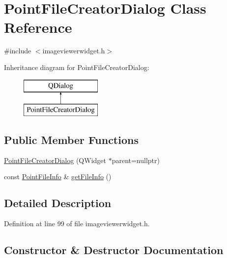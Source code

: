 \hypertarget{class_point_file_creator_dialog}{}\section{Point\+File\+Creator\+Dialog Class Reference}
\label{class_point_file_creator_dialog}


{\ttfamily \#include $<$imageviewerwidget.\+h$>$}

Inheritance diagram for Point\+File\+Creator\+Dialog\+:\begin{figure}[H]
\begin{center}
\leavevmode
\includegraphics[height=2.000000cm]{class_point_file_creator_dialog}
\end{center}
\end{figure}
\subsection*{Public Member Functions}
\begin{DoxyCompactItemize}
\item 
\mbox{\hyperlink{class_point_file_creator_dialog_a5fb479cb3f0b9ff13ee8e511e939d005}{Point\+File\+Creator\+Dialog}} (Q\+Widget $\ast$parent=nullptr)
\item 
const \mbox{\hyperlink{struct_point_file_info}{Point\+File\+Info}} \& \mbox{\hyperlink{class_point_file_creator_dialog_ae799dc6352f8cae7f26bc3902d4d123c}{get\+File\+Info}} ()
\end{DoxyCompactItemize}


\subsection{Detailed Description}


Definition at line 99 of file imageviewerwidget.\+h.



\subsection{Constructor \& Destructor Documentation}
\mbox{\label{class_point_file_creator_dialog_a5fb479cb3f0b9ff13ee8e511e939d005}} 
